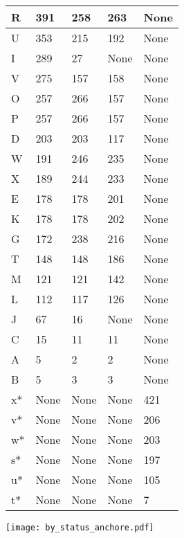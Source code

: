 \begin{center}
\begin{longtable} {| p{} | p{} | p{} | p{} | p{} |}
R  &    391   &   258  &   263   &   None    \\   
\hline
U  &    353   &   215  &   192   &   None    \\   
\hline
I  &    289   &   27  &   None   &   None    \\   
\hline
V  &    275   &   157  &   158   &   None    \\   
\hline
O  &    257   &   266  &   157   &   None    \\   
\hline
P  &    257   &   266  &   157   &   None    \\   
\hline
D  &    203   &   203  &   117   &   None    \\   
\hline
W  &    191   &   246  &   235   &   None    \\   
\hline
X  &    189   &   244  &   233   &   None    \\   
\hline
E  &    178   &   178  &   201   &   None    \\   
\hline
K  &    178   &   178  &   202   &   None    \\   
\hline
G  &    172   &   238  &   216   &   None    \\   
\hline
T  &    148   &   148  &   186   &   None    \\   
\hline
M  &    121   &   121  &   142   &   None    \\   
\hline
L  &    112   &   117  &   126   &   None    \\   
\hline
J  &    67   &   16  &   None   &   None    \\   
\hline
C  &    15   &   11  &   11   &   None    \\   
\hline
A  &    5   &   2  &   2   &   None    \\   
\hline
B  &    5   &   3  &   3   &   None    \\   
\hline
x*  &    None   &   None  &   None   &   421    \\   
\hline
v*  &    None   &   None  &   None   &   206    \\   
\hline
w*  &    None   &   None  &   None   &   203    \\   
\hline
s*  &    None   &   None  &   None   &   197    \\   
\hline
u*  &    None   &   None  &   None   &   105    \\   
\hline
t*  &    None   &   None  &   None   &   7    \\   
\hline
\end{longtable}
\label{tab:vulnerabilities}
\end{center}
\begin{center}
\texttt{[image: by\_status\_anchore.pdf]}
\label{fig:anchore}
\end{center}


